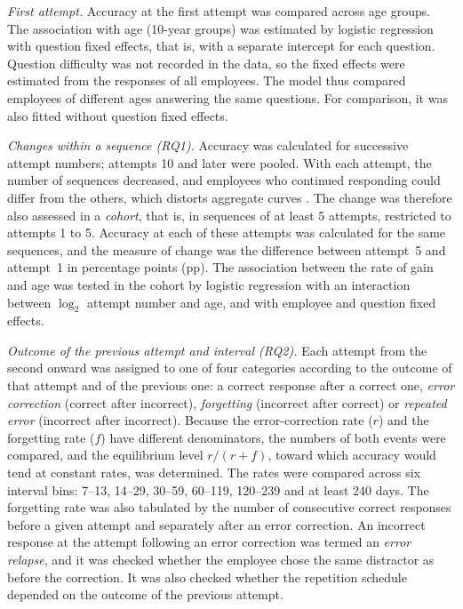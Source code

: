 \documentclass[preprint,12pt,authoryear]{elsarticle}
\begin{document}
\emph{First attempt.} Accuracy at the first attempt was compared across age groups. The association
with age (10-year groups) was estimated by logistic regression with question fixed effects, that is,
with a separate intercept for each question. Question difficulty was not recorded in the data, so the
fixed effects were estimated from the responses of all employees. The model thus compared employees of
different ages answering the same questions. For comparison, it was also fitted without question fixed
effects.

\emph{Changes within a sequence (RQ1).} Accuracy was calculated for successive attempt numbers;
attempts 10 and later were pooled. With each attempt, the number of sequences
decreased, and employees who continued responding could differ from the others, which distorts
aggregate curves \citep{murray2013}. The change was therefore also assessed in a \emph{cohort}, that
is, in sequences of at least 5 attempts, restricted to attempts 1 to 5. Accuracy at
each of these attempts was calculated for the same sequences, and the measure of change was the
difference between attempt~5 and attempt~1 in percentage points (pp).
The association between the rate of gain and age was tested in the cohort by logistic regression with
an interaction between $\log_2$ attempt number and age, and with employee and question fixed effects.

\emph{Outcome of the previous attempt and interval (RQ2).} Each attempt from the second onward was
assigned to one of four categories according to the outcome of that attempt and of the previous one:
a correct response after a correct one, \emph{error correction} (correct after incorrect),
\emph{forgetting} (incorrect after correct) or \emph{repeated error} (incorrect after incorrect).
Because the error-correction rate ($r$) and the forgetting rate ($f$) have different denominators, the
numbers of both events were compared, and the equilibrium level $r/(r+f)$, toward which accuracy would
tend at constant rates, was determined. The rates were compared across six interval bins:
7--13, 14--29, 30--59, 60--119, 120--239 and at least 240 days. The forgetting rate was also
tabulated by the number of consecutive correct responses before a given attempt and separately after an
error correction. An incorrect response at the attempt following an error correction was termed an
\emph{error relapse}, and it was checked whether the employee chose the same distractor as before the
correction. It was also checked whether the repetition schedule depended on the outcome of the
previous attempt.
\end{document}
